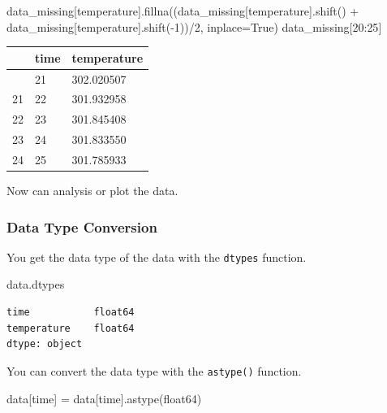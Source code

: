 \documentclass[
  letterpaper,
  DIV=11,
  numbers=noendperiod]{scrreprt}
\newenvironment{Shaded}{\begin{snugshade}}{\end{snugshade}}
\newcommand{\DecValTok}[1]{\textcolor[rgb]{0.68,0.00,0.00}{#1}}
\newcommand{\NormalTok}[1]{\textcolor[rgb]{0.00,0.23,0.31}{#1}}
\newcommand{\OperatorTok}[1]{\textcolor[rgb]{0.37,0.37,0.37}{#1}}
\newcommand{\StringTok}[1]{\textcolor[rgb]{0.13,0.47,0.30}{#1}}
\newcommand{\VariableTok}[1]{\textcolor[rgb]{0.07,0.07,0.07}{#1}}
\begin{document}
\begin{Shaded}
\begin{Highlighting}[]
\NormalTok{data\_missing[}\StringTok{\textquotesingle{}temperature\textquotesingle{}}\NormalTok{].fillna((data\_missing[}\StringTok{\textquotesingle{}temperature\textquotesingle{}}\NormalTok{].shift() }\OperatorTok{+}\NormalTok{ data\_missing[}\StringTok{\textquotesingle{}temperature\textquotesingle{}}\NormalTok{].shift(}\OperatorTok{{-}}\DecValTok{1}\NormalTok{))}\OperatorTok{/}\DecValTok{2}\NormalTok{, inplace}\OperatorTok{=}\VariableTok{True}\NormalTok{)}
\NormalTok{data\_missing[}\DecValTok{20}\NormalTok{:}\DecValTok{25}\NormalTok{]}
\end{Highlighting}
\end{Shaded}

\begin{longtable}[]{@{}lll@{}}
\toprule\noalign{}
& time & temperature \\
\midrule\noalign{}
\endhead
\bottomrule\noalign{}
\endlastfoot
20 & 21 & 302.020507 \\
21 & 22 & 301.932958 \\
22 & 23 & 301.845408 \\
23 & 24 & 301.833550 \\
24 & 25 & 301.785933 \\
\end{longtable}

Now can analysis or plot the data.

\subsubsection*{Data Type Conversion}\label{data-type-conversion-1}

You get the data type of the data with the \texttt{dtypes} function.

\begin{Shaded}
\begin{Highlighting}[]
\NormalTok{data.dtypes}
\end{Highlighting}
\end{Shaded}

\begin{verbatim}
time           float64
temperature    float64
dtype: object
\end{verbatim}

You can convert the data type with the \texttt{astype()} function.

\begin{Shaded}
\begin{Highlighting}[]
\NormalTok{data[}\StringTok{\textquotesingle{}time\textquotesingle{}}\NormalTok{] }\OperatorTok{=}\NormalTok{ data[}\StringTok{\textquotesingle{}time\textquotesingle{}}\NormalTok{].astype(}\StringTok{\textquotesingle{}float64\textquotesingle{}}\NormalTok{)}
\end{Highlighting}
\end{Shaded}
\end{document}
